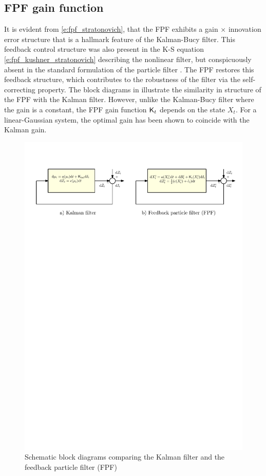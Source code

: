 \subsection{FPF gain function}
\label{s:fpf_gain}
It is evident from \eqref{e:fpf_stratonovich}, that the FPF exhibits a gain $\times$ innovation error structure that is a hallmark feature of the Kalman-Bucy filter. This feedback control structure was also present in the K-S equation \eqref{e:fpf_kushner_stratonovich} describing the nonlinear filter, but conspicuously absent in the standard formulation of the particle filter . The FPF restores this feedback structure, which contributes to the robustness of the filter via the self-correcting property.  The block diagrams in  illustrate the similarity in structure of the FPF with the Kalman filter. However, unlike the Kalman-Bucy filter where the gain is a constant, the FPF gain function $\text{\sf K}_t$ depends on the state $X_t$. For a linear-Gaussian system, the optimal gain has been shown to coincide with the Kalman gain. 
\begin{figure}[htbp]
	\centering
		\includegraphics[width = 7in]{images/Chap4_FPF_Kalman}
		\caption{Schematic block diagrams comparing the Kalman filter and the feedback particle filter (FPF) \cite{yanmehmey13}}
		\label{fig:fpf_kalman}
\end{figure}

